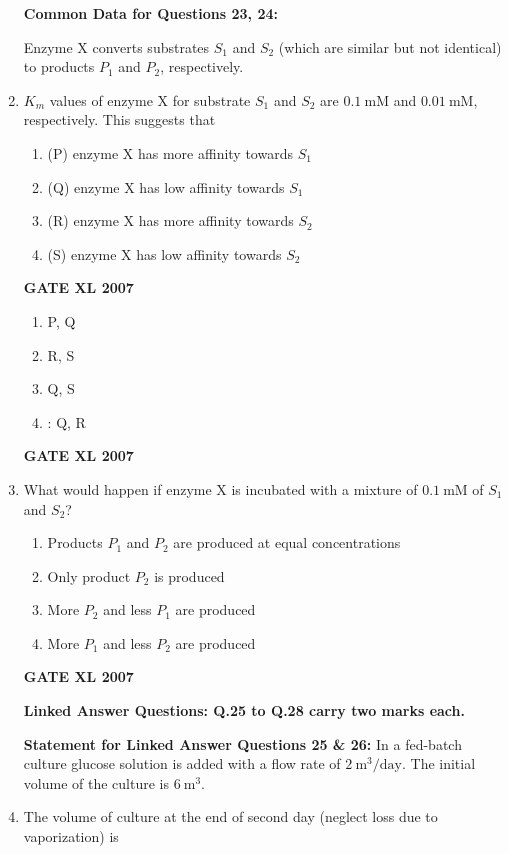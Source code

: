 \documentclass[journal,12pt,onecolumn]{IEEEtran}
\begin{document}
\begin{enumerate}
\textbf{Common Data for Questions 23, 24:}

  Enzyme X converts substrates $S_1$ and $S_2$ (which are similar but not identical) to products $P_1$ and $P_2$, respectively.

\item $K_m$ values of enzyme X for substrate $S_1$ and $S_2$ are $0.1\ \text{mM}$ and $0.01\ \text{mM}$, respectively. This suggests that

  \begin{enumerate}
    \item (P) enzyme X has more affinity towards $S_1$
    \item (Q) enzyme X has low affinity towards $S_1$
    \item (R) enzyme X has more affinity towards $S_2$
    \item (S) enzyme X has low affinity towards $S_2$
  \end{enumerate}
	    \hfill \textbf{GATE XL 2007}

  \begin{enumerate}
    \item P, Q
    \item R, S
    \item Q, S
    \item: Q, R
  \end{enumerate}
	    \hfill \textbf{GATE XL 2007}

  \item What would happen if enzyme X is incubated with a mixture of $0.1\ \text{mM}$ of $S_1$ and $S_2$?

  \begin{enumerate}
    \item  Products $P_1$ and $P_2$ are produced at equal concentrations
    \item  Only product $P_2$ is produced
    \item  More $P_2$ and less $P_1$ are produced
    \item  More $P_1$ and less $P_2$ are produced
  \end{enumerate}
	    \hfill \textbf{GATE XL 2007}

  \textbf{Linked Answer Questions: Q.25 to Q.28 carry two marks each.}

  \textbf{Statement for Linked Answer Questions 25 \& 26:}
  In a fed-batch culture glucose solution is added with a flow rate of $2\ \text{m}^3/\text{day}$. The initial volume of the culture is $6\ \text{m}^3$.

  \item The volume of culture at the end of second day (neglect loss due to vaporization) is


\end{enumerate}
\end{document}
